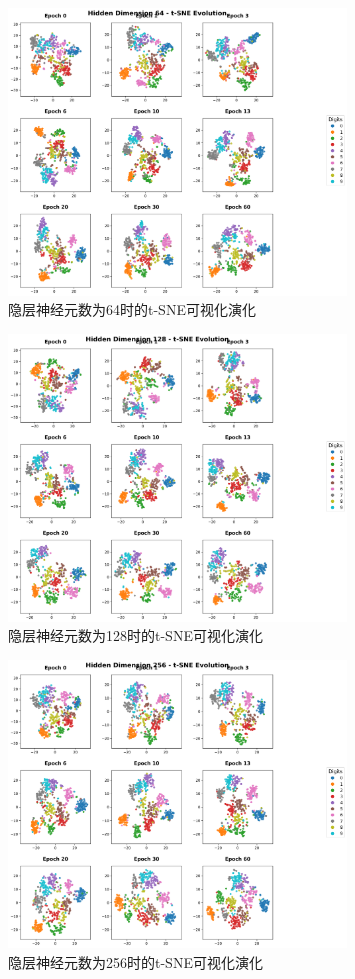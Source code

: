 \begin{figure}[H]
    \centering
    \includegraphics[width=0.8\textwidth]{../images/pa/tsne_evolution_hidden_64.png}
    \caption{隐层神经元数为64时的t-SNE可视化演化}
    \label{fig:64}
\end{figure}
\begin{figure}[H]
    \centering
    \includegraphics[width=0.8\textwidth]{../images/pa/tsne_evolution_hidden_128.png}
    \caption{隐层神经元数为128时的t-SNE可视化演化}
    \label{fig:128}
\end{figure}
\begin{figure}[H]
    \centering
    \includegraphics[width=0.8\textwidth]{../images/pa/tsne_evolution_hidden_256.png}
    \caption{隐层神经元数为256时的t-SNE可视化演化}
    \label{fig:256}
\end{figure}
